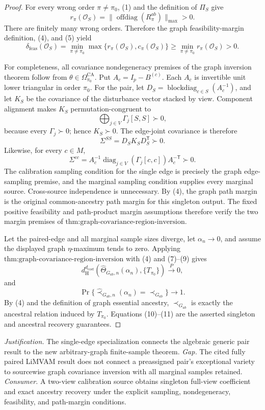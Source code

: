 \documentclass{article}
\begin{document}
\begin{proof}
For every wrong order \(\pi\ne\pi_0\), (1) and the definition of \(\Pi_S\) give
\[
r_\pi(\mathcal O_S)=
\|\operatorname{offdiag}(R_\pi^{ab})\|_{\max}>0.
\tag{5}
\]
There are finitely many wrong orders.  Therefore the graph feasibility-margin definition, (4), and (5) yield
\[
\delta_{\mathrm{feas}}(\mathcal O_S)
=\min_{\pi\ne\pi_0}\max\{r_\pi(\mathcal O_S),c_\pi(\mathcal O_S)\}
\ge\min_{\pi\ne\pi_0}r_\pi(\mathcal O_S)>0.
\tag{6}
\]

For completeness, all covariance nondegeneracy premises of the graph inversion theorem follow from \(\theta\in\Omega_{\pi_0}^{\mathrm{CA}}\).  Put \(A_c=I_p-B^{(c)}\).  Each \(A_c\) is invertible unit lower triangular in order \(\pi_0\).  For the pair, let \(D_S=\operatorname{blockdiag}_{c\in S}(A_c^{-1})\), and let \(K_S\) be the covariance of the disturbance vector stacked by view.  Component alignment makes \(K_S\) permutation-congruent to
\[
\bigoplus_{j\in V}\Gamma_j[S,S]\succ0,
\tag{7}
\]
because every \(\Gamma_j\succ0\); hence \(K_S\succ0\).  The edge-joint covariance is therefore
\[
\Sigma^{SS}=D_SK_SD_S^{\mathsf T}\succ0.
\tag{8}
\]
Likewise, for every \(c\in M\),
\[
\Sigma^{cc}=A_c^{-1}
\operatorname{diag}_{j\in V}(\Gamma_j[c,c])
A_c^{-\mathsf T}\succ0.
\tag{9}
\]
The calibration sampling condition for the single edge is precisely the graph edge-sampling premise, and the marginal sampling condition supplies every marginal source.  Cross-source independence is unnecessary.  By (4), the graph path margin is the original common-ancestry path margin for this singleton output.  The fixed positive feasibility and path-product margin assumptions therefore verify the two margin premises of \(\text{thm:graph-covariance-region-inversion}\).

Let the paired-edge and all marginal sample sizes diverge, let \(\alpha_n\to0\), and assume the displayed graph \(\eta\)-maximum tends to zero.  Applying \(\text{thm:graph-covariance-region-inversion}\) with (4) and (7)--(9) gives
\[
d_{\mathrm H}^{d_{\mathrm{coef}}}
(\widehat\Theta_{G_{ab},n}(\alpha_n),\{T_{\pi_0}\})
\xrightarrow{P}0,
\tag{10}
\]
and
\[
\Pr\{\widehat\prec_{G_{ab},n}(\alpha_n)=\prec_{G_{ab}}\}
\longrightarrow1.
\tag{11}
\]
By (4) and the definition of graph essential ancestry, \(\prec_{G_{ab}}\) is exactly the ancestral relation induced by \(T_{\pi_0}\).  Equations (10)--(11) are the asserted singleton and ancestral recovery guarantees.
\end{proof}
\par\smallskip\noindent \textit{Justification.} The single-edge specialization connects the algebraic generic pair result to the new arbitrary-graph finite-sample theorem. \textit{Gap.} The cited fully paired LiMVAM result does not connect a preassigned pair's exceptional variety to sourcewise graph covariance inversion with all marginal samples retained. \textit{Consumer.} A two-view calibration source obtains singleton full-view coefficient and exact ancestry recovery under the explicit sampling, nondegeneracy, feasibility, and path-margin conditions.
\end{document}
